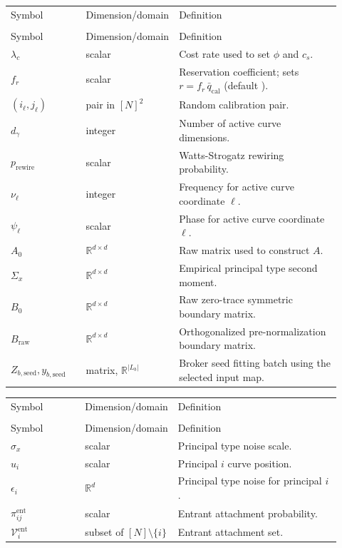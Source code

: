 \documentclass[11pt]{article}
\makeatletter
\newcommand{\R}{\mathbb{R}}
\newcommand{\procInitialize}{Initialize}
\newcommand{\procInitializePrincipal}{InitializePrincipal}
\newenvironment{localvartable}[1]{%
\begingroup
\small
\setlength{\tabcolsep}{4pt}
\renewcommand{\arraystretch}{1.08}
\begin{longtable}{>{\raggedright\arraybackslash}p{0.23\linewidth}
                >{\raggedright\arraybackslash}p{0.18\linewidth}
                >{\raggedright\arraybackslash}p{0.51\linewidth}}
\toprule
\multicolumn{3}{@{}l}{\textit{Local variables for #1}}\\
\midrule
Symbol & Dimension/domain & Definition \\
\midrule
\endfirsthead
\toprule
\multicolumn{3}{@{}l}{\textit{Local variables for #1 (continued)}}\\
\midrule
Symbol & Dimension/domain & Definition \\
\midrule
\endhead
}{%
\bottomrule
\end{longtable}
\endgroup
}
\makeatother
\begin{document}
\begin{localvartable}{\procInitialize}
$\lambda_c$ & scalar & Cost rate used to set $\phi$ and $c_s$. \\
$f_r$ & scalar & Reservation coefficient; sets $r=f_r\,\bar q_{\mathrm{cal}}$ (default \pv{settingreservation_fracFixed}). \\
$(i_\ell,j_\ell)$ & pair in $[N]^2$ & Random calibration pair. \\
$d_\gamma$ & integer & Number of active curve dimensions. \\
$p_{\mathrm{rewire}}$ & scalar & Watts-Strogatz rewiring probability. \\
$\nu_\ell$ & integer & Frequency for active curve coordinate $\ell$. \\
$\psi_\ell$ & scalar & Phase for active curve coordinate $\ell$. \\
$A_0$ & $\R^{d\times d}$ & Raw matrix used to construct $A$. \\
$\Sigma_x$ & $\R^{d\times d}$ & Empirical principal type second moment. \\
$B_0$ & $\R^{d\times d}$ & Raw zero-trace symmetric boundary matrix. \\
$B_{\mathrm{raw}}$ & $\R^{d\times d}$ & Orthogonalized pre-normalization boundary matrix. \\
$Z_{b,\mathrm{seed}},y_{b,\mathrm{seed}}$ & matrix, $\R^{|L_b|}$ & Broker seed fitting batch using the selected input map. \\
\end{localvartable}

\begin{localvartable}{\procInitializePrincipal}
$\sigma_x$ & scalar & Principal type noise scale. \\
$u_i$ & scalar & Principal $i$ curve position. \\
$\epsilon_i$ & $\R^d$ & Principal type noise for principal $i$. \\
$\pi_{ij}^{\mathrm{ent}}$ & scalar & Entrant attachment probability. \\
$\mathcal V_i^{\mathrm{ent}}$ & subset of $[N]\setminus\{i\}$ & Entrant attachment set. \\
\end{localvartable}
\end{document}

